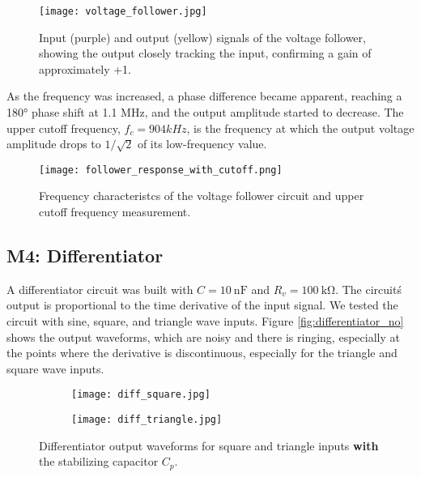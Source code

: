 \documentclass[12pt,a4paper]{article}
\begin{document}
\begin{figure}[H]
    \centering
    \texttt{[image: voltage\_follower.jpg]} 
    \caption{Input (purple) and output (yellow) signals of the voltage follower, showing the output closely tracking the input, confirming a gain of approximately +1.}
    \label{fig:follower_unity}
\end{figure}

As the frequency was increased, a phase difference became apparent, reaching a 180° phase shift at 1.1 MHz, and the output amplitude started to decrease. The upper cutoff frequency, \(f_c = 904 kHz\), is the frequency at which the output voltage amplitude drops to \(1/\sqrt{2}\) of its low-frequency value.

\begin{figure}[H]
    \centering
    \texttt{[image: follower\_response\_with\_cutoff.png]} 
    \caption{Frequency characteristcs of the voltage follower circuit and upper cutoff frequency measurement.}
    \label{fig:follower_unity_frequency_response}
\end{figure}


\subsection{M4: Differentiator}
A differentiator circuit was built with \(C = \SI{10}{\nano\farad}\) and \(R_v = \SI{100}{\kilo\ohm}\). The circuit\'s output is proportional to the time derivative of the input signal. We tested the circuit with sine, square, and triangle wave inputs. Figure \ref{fig:differentiator_no} shows the output waveforms, which are noisy and there is ringing, especially at the points where the derivative is discontinuous, especially for the triangle and square wave inputs. 

\begin{figure}[H]
    \centering
    \begin{subfigure}[b]{0.32\linewidth}
        \texttt{[image: diff\_square.jpg]} 
    \end{subfigure}
    \begin{subfigure}[b]{0.32\linewidth}
        \texttt{[image: diff\_triangle.jpg]} 
    \end{subfigure}
    \caption{Differentiator output waveforms for square and triangle inputs \textbf{with} the stabilizing capacitor \(C_p\).}
    \label{fig:differentiator}
\end{figure}
\end{document}
